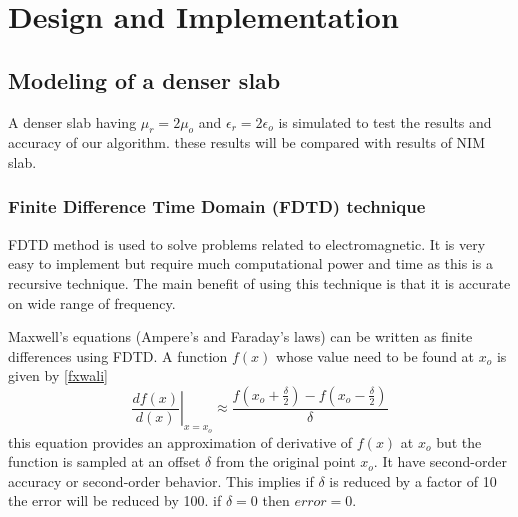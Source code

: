 
\chapter{Design and Implementation} %

\label{Chapter2} %

\fancyhead[RO]{\thepage}
\fancyhead[RE]{\thepage}

\section{Modeling of a denser slab}

A denser slab having $\mu_r = 2\mu_o$ and $\epsilon_r = 2\epsilon_o$
is simulated to test the results and accuracy of our algorithm. these results will be compared with
results of NIM slab.

\subsection{Finite Difference Time Domain (FDTD) technique}
FDTD method is used to solve problems related to electromagnetic. It is very easy to implement but require much computational power and time as this is a recursive technique. The main benefit of using this technique is that it is accurate on wide range of frequency. 

Maxwell's equations (Ampere's and Faraday's laws) can be written as finite differences using FDTD. A function $f(x)$ whose value need to be found at $x_o$ is given by \eqref{fxwali}
	\begin{equation}
	\left. \frac {df(x)}{d(x)}\right|_{x=x_o} \approx 
	\frac {f \left( x_o + \frac{\delta}{2} \right) - f \left( x_o - \frac{\delta}{2} \right) }{\delta}
	\label{fxwali}
	\end{equation}
this equation provides an approximation of derivative of $f(x)$ at $x_o$ but the function is sampled at an offset $\delta$ from the original point $x_o$. It have second-order accuracy or second-order behavior. This implies if $\delta$ is reduced by a factor of 10 the error will be reduced by 100. if $\delta = 0$ then $error = 0$.

